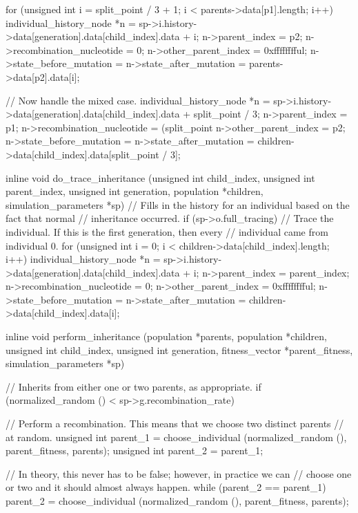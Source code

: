 \documentclass{article}
\begin{document}
\begin{ccode}
{{    for (unsigned int i = split_point / 3 + 1; i < parents->data[p1].length; i++) {
      individual_history_node *n =
        sp->i.history->data[generation].data[child_index].data + i;
      n->parent_index = p2;
      n->recombination_nucleotide = 0;
      n->other_parent_index = 0xfffffffful;
      n->state_before_mutation = n->state_after_mutation =
        parents->data[p2].data[i];
    }

    // Now handle the mixed case.
    individual_history_node *n =
      sp->i.history->data[generation].data[child_index].data + split_point / 3;
    n->parent_index = p1;
    n->recombination_nucleotide = (split_point %
    n->other_parent_index = p2;
    n->state_before_mutation = n->state_after_mutation =
      children->data[child_index].data[split_point / 3];
  }
}

inline void do_trace_inheritance (unsigned int child_index, unsigned int parent_index,
				  unsigned int generation, population *children,
				  simulation_parameters *sp) {
  // Fills in the history for an individual based on the fact that normal
  // inheritance occurred.
  if (sp->o.full_tracing)
    // Trace the individual. If this is the first generation, then every
    // individual came from individual 0.
    for (unsigned int i = 0; i < children->data[child_index].length; i++) {
      individual_history_node *n = sp->i.history->data[generation].data[child_index].data + i;
      n->parent_index = parent_index;
      n->recombination_nucleotide = 0;
      n->other_parent_index = 0xfffffffful;
      n->state_before_mutation = n->state_after_mutation =
       children->data[child_index].data[i];
    }
}

inline void perform_inheritance (population *parents, population *children,
				 unsigned int child_index, unsigned int generation,
				 fitness_vector *parent_fitness,
				 simulation_parameters *sp) {
  // Inherits from either one or two parents, as appropriate.
  if (normalized_random () < sp->g.recombination_rate) {
    // Perform a recombination. This means that we choose two distinct parents
    // at random.
    unsigned int parent_1 = choose_individual (normalized_random (), parent_fitness, parents);
    unsigned int parent_2 = parent_1;

    // In theory, this never has to be false; however, in practice we can
    // choose one or two and it should almost always happen.
    while (parent_2 == parent_1)
      parent_2 = choose_individual (normalized_random (), parent_fitness, parents);

}}
\end{ccode}
\end{document}
